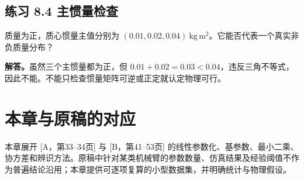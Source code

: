 \subsection*{练习 8.4 主惯量检查}
质量为正，质心惯量主值分别为 $(0.01,0.02,0.04)\ \mathrm{kg\,m^2}$。它能否代表一个真实非负质量分布？

\textbf{解答。}虽然三个主惯量都为正，但 $0.01+0.02=0.03<0.04$，违反三角不等式，因此不能。不能只检查惯量矩阵可逆或正定就认定物理可行。

\section*{本章与原稿的对应}
本章展开 [A，第33--34页] 与 [B，第41--53页] 的线性参数化、基参数、最小二乘、协方差和辨识方法。原稿中针对某类机械臂的参数数量、仿真结果及经验阈值不作为普遍结论沿用；本章提供可逐项复算的小型数据集，并明确统计与物理假设。
